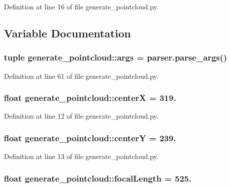 \-Definition at line 16 of file generate\-\_\-pointcloud.\-py.



\subsection{\-Variable \-Documentation}
\subsubsection[{args}]{\setlength{\rightskip}{0pt plus 5cm}tuple {\bf generate\-\_\-pointcloud\-::args} = parser.\-parse\-\_\-args()}\label{namespacegenerate__pointcloud_a33fd720b5366d7f81ee78458f575197f}


\-Definition at line 61 of file generate\-\_\-pointcloud.\-py.

\subsubsection[{center\-X}]{\setlength{\rightskip}{0pt plus 5cm}float {\bf generate\-\_\-pointcloud\-::center\-X} = 319.}\label{namespacegenerate__pointcloud_a72555a1a8d17bb26de76bd53e96353ec}


\-Definition at line 12 of file generate\-\_\-pointcloud.\-py.

\subsubsection[{center\-Y}]{\setlength{\rightskip}{0pt plus 5cm}float {\bf generate\-\_\-pointcloud\-::center\-Y} = 239.}\label{namespacegenerate__pointcloud_a9c7d17eeb667ee73600a020694898dab}


\-Definition at line 13 of file generate\-\_\-pointcloud.\-py.

\subsubsection[{focal\-Length}]{\setlength{\rightskip}{0pt plus 5cm}float {\bf generate\-\_\-pointcloud\-::focal\-Length} = 525.}\label{namespacegenerate__pointcloud_a95cdca35062e2b9a23de94d78483ed7d}


